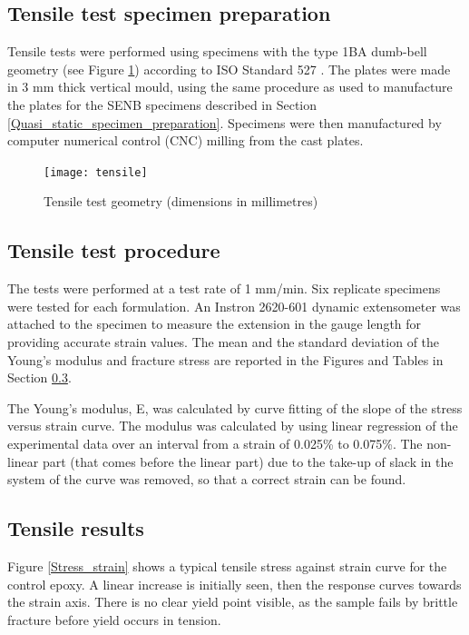 \documentclass[numbers=noendperiod,chapterprefix=on]{icldt} %
\begin{document}
\subsection{Tensile test specimen preparation}

Tensile tests were performed using specimens with the type 1BA dumb-bell geometry (see Figure \ref{tensile}) according to ISO Standard 527 \cite{Blackman2003c}. The plates were made in 3 mm thick vertical mould, using the same procedure as used to manufacture the plates for the SENB specimens described in Section \ref{Quasi_static_specimen_preparation}. Specimens were then manufactured by computer numerical control (CNC) milling from the cast plates.  

\begin{figure}[!htpb]
\centering
\texttt{[image: tensile]}
\caption{Tensile test geometry (dimensions in millimetres) \cite{Chong2015}} \label{tensile}
\end{figure}

\subsection{Tensile test procedure} \label{Tensile_test_procedure}

The tests were performed at a test rate of 1 mm/min. Six replicate specimens were tested for each formulation. An Instron 2620-601 dynamic extensometer was attached to the specimen to measure the extension in the gauge length for providing accurate strain values. 
The mean and the standard deviation of the Young's modulus and fracture stress are reported in the Figures and Tables in Section \ref{Tensile_results}.

The Young's modulus, E, was calculated by curve fitting of the slope of the stress versus strain curve.
The modulus was calculated by using linear regression of the experimental data over an interval from a strain of 0.025\% to 0.075\%.
The non-linear part (that comes before the linear part)
due to the take-up of slack in the system of the curve was removed, so that a correct strain can be found. 

\subsection{Tensile results} \label{Tensile_results}
Figure \ref{Stress_strain} shows a typical tensile stress against strain curve for the control epoxy. A linear increase 
is initially seen, then the response curves towards the strain axis. There is no clear yield point visible, as the sample fails by brittle fracture before yield occurs in tension.
\end{document}
